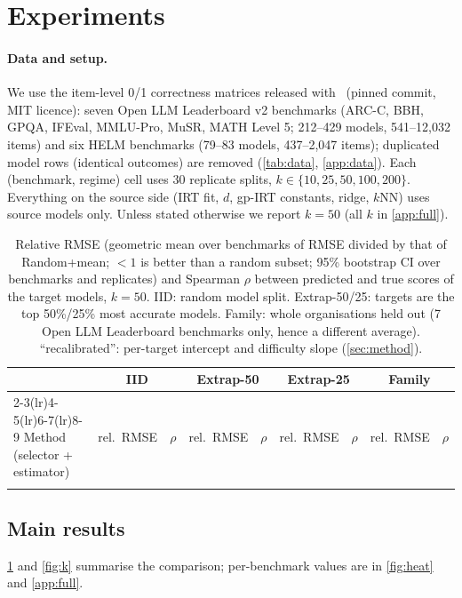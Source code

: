 \section{Experiments}
\label{sec:results}

\paragraph{Data and setup.}
We use the item-level 0/1 correctness matrices released with~\citet{zhang2025benchmark} (pinned commit, MIT licence): seven Open LLM Leaderboard v2 benchmarks (ARC-C, BBH, GPQA, IFEval, MMLU-Pro, MuSR, MATH Level 5; 212--429 models, 541--12{,}032 items) and six HELM benchmarks (79--83 models, 437--2{,}047 items); duplicated model rows (identical outcomes) are removed (\cref{tab:data}, \cref{app:data}).
Each (benchmark, regime) cell uses 30 replicate splits, $k\in\{10,25,50,100,200\}$.
Everything on the source side (IRT fit, $d$, gp-IRT constants, ridge, $k$NN) uses source models only. Unless stated otherwise we report $k=50$ (all $k$ in \cref{app:full}).

\begin{table}[t]
\caption{Relative RMSE (geometric mean over benchmarks of RMSE divided by that of Random+mean; $<1$ is better than a random subset; 95\% bootstrap CI over benchmarks and replicates) and Spearman $\rho$ between predicted and true scores of the target models, $k=50$. IID: random model split. Extrap-50/25: targets are the top 50\%/25\% most accurate models. Family: whole organisations held out (7 Open LLM Leaderboard benchmarks only, hence a different average). ``recalibrated'': per-target intercept and difficulty slope (\cref{sec:method}).}
\label{tab:main}
\centering\footnotesize
\setlength{\tabcolsep}{3pt}
\begin{tabular}{lcccccccc}
\toprule
 & \multicolumn{2}{c}{IID} & \multicolumn{2}{c}{Extrap-50} & \multicolumn{2}{c}{Extrap-25} & \multicolumn{2}{c}{Family}\\
\cmidrule(lr){2-3}\cmidrule(lr){4-5}\cmidrule(lr){6-7}\cmidrule(lr){8-9}
Method (selector + estimator) & rel.\ RMSE & $\rho$ & rel.\ RMSE & $\rho$ & rel.\ RMSE & $\rho$ & rel.\ RMSE & $\rho$ \\
\midrule
\\
\bottomrule
\end{tabular}
\end{table}

\subsection{Main results}
\cref{tab:main} and \cref{fig:k} summarise the comparison; per-benchmark values are in \cref{fig:heat} and \cref{app:full}.

